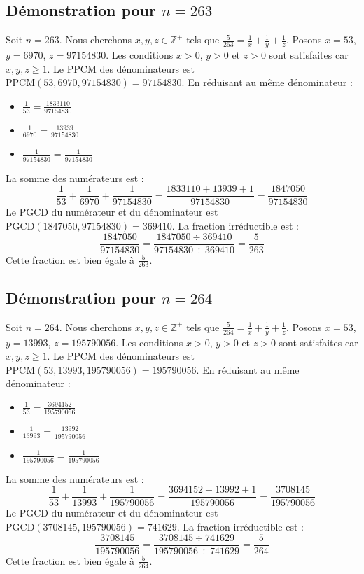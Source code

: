 \documentclass[11pt,a4paper]{article}
\begin{document}
\subsection{Démonstration pour $n = 263$}
Soit $n = 263$. Nous cherchons $x, y, z \in \mathbb{Z}^{+}$ tels que $\frac{5}{263} = \frac{1}{x} + \frac{1}{y} + \frac{1}{z}$.
Posons $x = 53$, $y = 6970$, $z = 97154830$.
Les conditions $x > 0$, $y > 0$ et $z > 0$ sont satisfaites car $x, y, z \geq 1$.
Le PPCM des dénominateurs est $\text{PPCM}(53, 6970, 97154830) = 97154830$.
En réduisant au même dénominateur :
\begin{itemize}
    \item $\frac{1}{53} = \frac{1833110}{97154830}$
    \item $\frac{1}{6970} = \frac{13939}{97154830}$
    \item $\frac{1}{97154830} = \frac{1}{97154830}$
\end{itemize}
La somme des numérateurs est :
$$ \frac{1}{53} + \frac{1}{6970} + \frac{1}{97154830} = \frac{1833110 + 13939 + 1}{97154830} = \frac{1847050}{97154830} $$
Le PGCD du numérateur et du dénominateur est $\text{PGCD}(1847050, 97154830) = 369410$.
La fraction irréductible est :
$$ \frac{1847050}{97154830} = \frac{1847050 \div 369410}{97154830 \div 369410} = \frac{5}{263} $$
Cette fraction est bien égale à $\frac{5}{263}$.

\subsection{Démonstration pour $n = 264$}
Soit $n = 264$. Nous cherchons $x, y, z \in \mathbb{Z}^{+}$ tels que $\frac{5}{264} = \frac{1}{x} + \frac{1}{y} + \frac{1}{z}$.
Posons $x = 53$, $y = 13993$, $z = 195790056$.
Les conditions $x > 0$, $y > 0$ et $z > 0$ sont satisfaites car $x, y, z \geq 1$.
Le PPCM des dénominateurs est $\text{PPCM}(53, 13993, 195790056) = 195790056$.
En réduisant au même dénominateur :
\begin{itemize}
    \item $\frac{1}{53} = \frac{3694152}{195790056}$
    \item $\frac{1}{13993} = \frac{13992}{195790056}$
    \item $\frac{1}{195790056} = \frac{1}{195790056}$
\end{itemize}
La somme des numérateurs est :
$$ \frac{1}{53} + \frac{1}{13993} + \frac{1}{195790056} = \frac{3694152 + 13992 + 1}{195790056} = \frac{3708145}{195790056} $$
Le PGCD du numérateur et du dénominateur est $\text{PGCD}(3708145, 195790056) = 741629$.
La fraction irréductible est :
$$ \frac{3708145}{195790056} = \frac{3708145 \div 741629}{195790056 \div 741629} = \frac{5}{264} $$
Cette fraction est bien égale à $\frac{5}{264}$.
\end{document}
